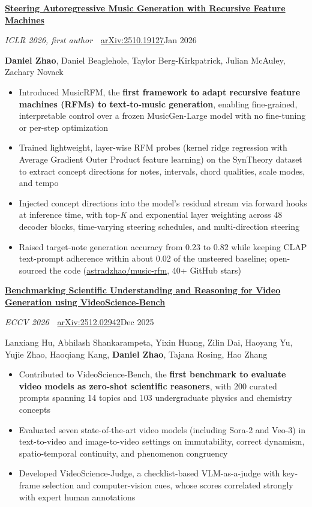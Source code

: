 \documentclass[letterpaper,11pt]{article}
\newcommand{\paper}[5]{%
  \needspace{6\baselineskip}%
  \textbf{\href{https://arxiv.org/abs/#2}{#1}}\par
  \textit{#3}\ \textbar\ \href{https://arxiv.org/abs/#2}{arXiv:#2}\hfill{#4}\par
  {\small #5\par}}
\newenvironment{bullets}
  {\begin{itemize}[leftmargin=1.2em, label=\textbullet, itemsep=0.5pt, parsep=0pt, topsep=2pt]}
  {\end{itemize}\vspace{5pt}}
\begin{document}
\paper{Steering Autoregressive Music Generation with Recursive Feature Machines}{2510.19127}
  {ICLR 2026, first author}{Jan 2026}
  {\textbf{Daniel Zhao}, Daniel Beaglehole, Taylor Berg-Kirkpatrick, Julian McAuley, Zachary Novack}
\begin{bullets}
  \item Introduced MusicRFM, the \textbf{first framework to adapt recursive feature machines (RFMs) to text-to-music generation}, enabling fine-grained, interpretable control over a frozen MusicGen-Large model with no fine-tuning or per-step optimization
  \item Trained lightweight, layer-wise RFM probes (kernel ridge regression with Average Gradient Outer Product feature learning) on the SynTheory dataset to extract concept directions for notes, intervals, chord qualities, scale modes, and tempo
  \item Injected concept directions into the model's residual stream via forward hooks at inference time, with top-\textit{K} and exponential layer weighting across 48 decoder blocks, time-varying steering schedules, and multi-direction steering
  \item Raised target-note generation accuracy from 0.23 to 0.82 while keeping CLAP text-prompt adherence within about 0.02 of the unsteered baseline; open-sourced the code (\href{https://github.com/astradzhao/music-rfm}{astradzhao/music-rfm}, 40+ GitHub stars)
\end{bullets}

\paper{Benchmarking Scientific Understanding and Reasoning for Video Generation using VideoScience-Bench}{2512.02942}
  {ECCV 2026}{Dec 2025}
  {Lanxiang Hu, Abhilash Shankarampeta, Yixin Huang, Zilin Dai, Haoyang Yu, Yujie Zhao, Haoqiang Kang, \textbf{Daniel Zhao}, Tajana Rosing, Hao Zhang}
\begin{bullets}
  \item Contributed to VideoScience-Bench, the \textbf{first benchmark to evaluate video models as zero-shot scientific reasoners}, with 200 curated prompts spanning 14 topics and 103 undergraduate physics and chemistry concepts
  \item Evaluated seven state-of-the-art video models (including Sora-2 and Veo-3) in text-to-video and image-to-video settings on immutability, correct dynamism, spatio-temporal continuity, and phenomenon congruency
  \item Developed VideoScience-Judge, a checklist-based VLM-as-a-judge with key-frame selection and computer-vision cues, whose scores correlated strongly with expert human annotations
\end{bullets}
\end{document}
